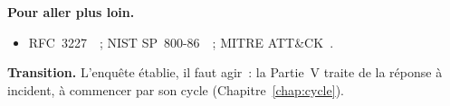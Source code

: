 \bigskip

\begin{boxinfo}
\textbf{Pour aller plus loin.}
\begin{itemize}
    \item RFC~3227~\cite{rfc3227}~; NIST SP~800-86~\cite{nist80086}~;
          MITRE ATT\&CK~\cite{mitreattack}.
\end{itemize}
\end{boxinfo}

\begin{boxinfo}
\textbf{Transition.} L'enquête établie, il faut agir~: la Partie~V traite de
la réponse à incident, à commencer par son cycle
(Chapitre~\ref{chap:cycle}).
\end{boxinfo}
